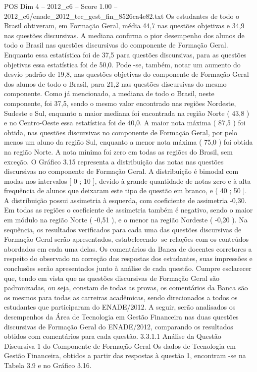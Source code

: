 \begin{textsample}{POS Dim 4 – 2012\_c6 – Score 1.00 – 2012\_c6/enade\_2012\_tec\_gest\_fin\_8526ca4e82.txt}
Os estudantes de todo o Brasil obtiveram, em Formação Geral, média 44,7 nas questões objetivas e 34,9 nas questões discursivas.
A mediana confirma o pior desempenho dos alunos de todo o Brasil nas questões discursivas do componente de Formação Geral.
Enquanto essa estatística foi de 37,5 para questões discursivas, para as questões objetivas essa estatística foi de 50,0.
Pode -se, também, notar um aumento do desvio padrão de 19,8, nas questões objetivas do componente de Formação Geral dos alunos de todo o Brasil, para 21,2 nas questões discursivas do mesmo componente.
Como já mencionado, a mediana de todo o Brasil, neste componente, foi 37,5, sendo o mesmo valor encontrado nas regiões Nordeste, Sudeste e Sul, enquanto a maior mediana foi encontrada na região Norte ( 43,8 ) e no Centro-Oeste essa estatística foi de 40,0.
A maior nota máxima ( 87,5 ) foi obtida, nas questões discursivas no componente de Formação Geral, por pelo menos um aluno da região Sul, enquanto a menor nota máxima ( 75,0 ) foi obtida na região Norte.
A nota mínima foi zero em todas as regiões do Brasil, sem exceção.
O Gráfico 3.15 representa a distribuição das notas nas questões discursivas no componente de Formação Geral.
A distribuição é bimodal com modas nos intervalos [ 0 ; 10 ], devido à grande quantidade de notas zero e à alta frequência de alunos que deixaram este tipo de questão em branco, e ( 40 ; 50 ].
A distribuição possui assimetria à esquerda, com coeficiente de assimetria -0,30.
Em todas as regiões o coeficiente de assimetria também é negativo, sendo o maior em módulo na região Norte ( -0,51 ), e o menor na região Nordeste ( -0,20 ).
Na sequência, os resultados verificados para cada uma das questões discursivas de Formação Geral serão apresentados, estabelecendo -se relações com os conteúdos abordados em cada uma delas.
Os comentários da Banca de docentes corretores a respeito do observado na correção das respostas dos estudantes, suas impressões e conclusões serão apresentados junto à análise de cada questão.
Cumpre esclarecer que, tendo em vista que as questões discursivas de Formação Geral são padronizadas, ou seja, constam de todas as provas, os comentários da Banca são os mesmos para todas as carreiras acadêmicas, sendo direcionados a todos os estudantes que participaram do ENADE/2012.
A seguir, serão analisados os desempenhos da Área de Tecnologia em Gestão Financeira nas duas questões discursivas de Formação Geral do ENADE/2012, comparando os resultados obtidos com comentários para cada questão. 3.3.1.1 Análise da Questão Discursiva 1 do Componente de Formação Geral Os dados de Tecnologia em Gestão Financeira, obtidos a partir das respostas à questão 1, encontram -se na Tabela 3.9 e no Gráfico 3.16.

\end{textsample}
